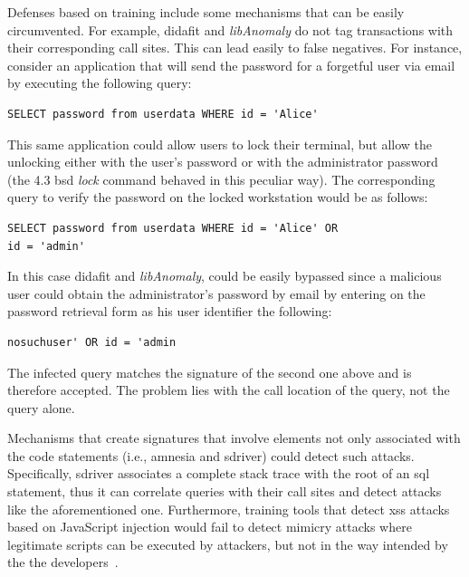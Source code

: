 \documentclass[conference]{IEEEtran}
\begin{document}
Defenses based on training include some mechanisms that can be easily
circumvented. For example, {\sc didafit} and {\it libAnomaly} do not
tag transactions with their corresponding call sites. This can lead
easily to false negatives. For instance, consider an application that
will send the password for a forgetful user via email by executing the
following query: \bgroup \lstset{language=SQL}
\begin{small}
\begin{lstlisting}
SELECT password from userdata WHERE id = 'Alice'
\end{lstlisting}
\end{small}
\egroup
\noindent
This same application could allow users to lock their terminal,
but allow the unlocking either with the user's password or with
the administrator password (the 4.3 {\sc bsd} {\em lock} command
behaved in this peculiar way).
The corresponding query to verify the password on the locked
workstation would be as follows:
\bgroup
\lstset{language=SQL}
\begin{small}
\begin{lstlisting}
SELECT password from userdata WHERE id = 'Alice' OR
id = 'admin'
\end{lstlisting}
\end{small}
\egroup
\noindent
In this case {\sc didafit} and {\it libAnomaly}, could be easily bypassed
since a malicious user could obtain the administrator's password
by email by entering on the password retrieval form
as his user identifier the following:
\bgroup
\lstset{language=SQL}
\begin{small}
\begin{lstlisting}
nosuchuser' OR id = 'admin
\end{lstlisting}
\end{small}
\egroup
\noindent
The infected query matches the signature of the second one above and
is therefore accepted. The problem lies with the call location of the
query, not the query alone.

Mechanisms that create signatures that involve elements not only
associated with the code statements (i.e., {\sc amnesia} and {\sc
  sd}river) could detect such attacks. Specifically, {\sc sd}river
associates a complete stack trace with the root of an {\sc sql}
statement, thus it can correlate queries with their call sites and
detect attacks like the aforementioned one. Furthermore, training
tools that detect {\sc xss} attacks based on JavaScript injection
would fail to detect mimicry attacks where legitimate scripts can be
executed by attackers, but not in the way intended by the the
developers~\cite{APKLM10}.
\end{document}
